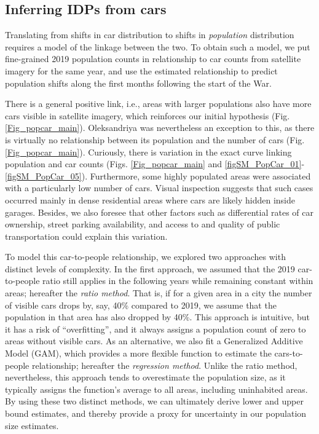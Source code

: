 \documentclass[sn-basic]{sn-jnl}%
\begin{document}
\subsection{Inferring IDPs from cars}\label{sec:pop_dynamics}

Translating from shifts in car distribution to shifts in \emph{population} distribution requires a model of the linkage between the two. To obtain such a model, we put fine-grained 2019 population counts in relationship to car counts from satellite imagery for the same year, and use the estimated relationship to predict population shifts along the first months following the start of the War. 

There is a general positive link, i.e., areas with larger populations also have more cars visible in satellite imagery, which reinforces our initial hypothesis (Fig. \ref{Fig_popcar_main}). Oleksandriya was nevertheless an exception to this, as there is virtually no relationship between its population and the number of cars (Fig. \ref{Fig_popcar_main}). Curiously, there is variation in the exact curve linking population and car counts (Figs. \ref{Fig_popcar_main} and \ref{figSM_PopCar_01}-\ref{figSM_PopCar_05}). Furthermore, some highly populated areas were associated with a particularly low number of cars. Visual inspection suggests that such cases occurred mainly in dense residential areas where cars are likely hidden inside garages. Besides, we also foresee that other factors such as differential rates of car ownership, street parking availability, and access to and quality of public transportation could explain this variation.

To model this car-to-people relationship, we explored two approaches with distinct levels of complexity. In the first approach, we assumed that the 2019 car-to-people ratio still applies in the following years while remaining constant within areas; hereafter the \textit{ratio method}. That is, if for a given area in a city the number of visible cars drops by, say, 40\% compared to 2019,  we assume that the population in that area has also dropped by 40\%. This approach is intuitive, but it has a risk of ``overfitting'', and it always assigns a population count of zero to areas without visible cars. As an alternative, we also fit a Generalized Additive Model (GAM), which provides a more flexible function to estimate the cars-to-people relationship; hereafter the \textit{regression method}. Unlike the ratio method, nevertheless, this approach tends to overestimate the population size, as it typically assigns the function's average to all areas, including uninhabited areas. By using these two distinct methods, we can ultimately derive lower and upper bound estimates, and thereby provide a proxy for uncertainty in our population size estimates.
\end{document}
